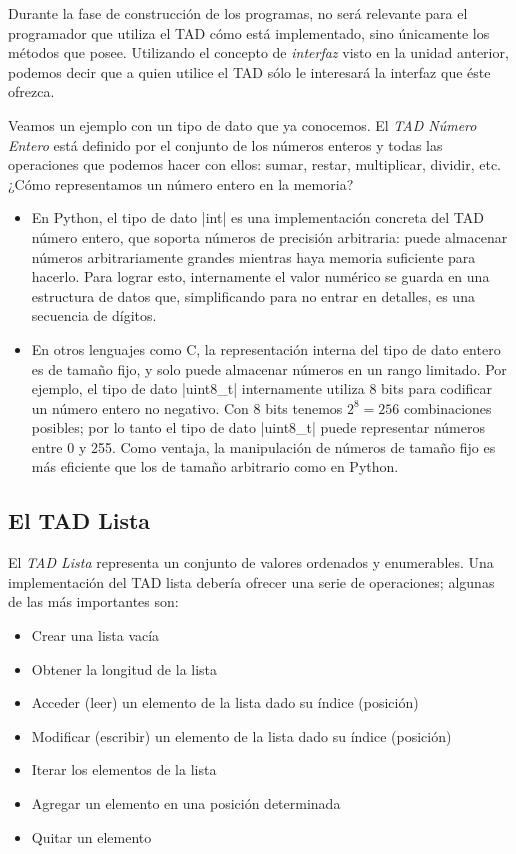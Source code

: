Durante la fase de construcción de los programas, no será relevante para el
programador que utiliza el TAD cómo está implementado, sino únicamente los
métodos que posee.
Utilizando el concepto de \emph{interfaz} visto en la unidad anterior, podemos
decir que a quien utilice el TAD sólo le interesará la interfaz que éste
ofrezca.

Veamos un ejemplo con un tipo de dato que ya conocemos. El \emph{TAD Número
Entero} está definido por el conjunto de los números enteros y todas las
operaciones que podemos hacer con ellos: sumar, restar, multiplicar, dividir,
etc. ¿Cómo representamos un número entero en la memoria?

\begin{itemize}
\item En Python, el tipo de dato |int| es una implementación concreta del TAD
número entero, que soporta números de precisión arbitraria: puede almacenar
números arbitrariamente grandes mientras haya memoria suficiente para hacerlo.
Para lograr esto, internamente el valor numérico se guarda en una estructura de
datos que, simplificando para no entrar en detalles, es una secuencia de dígitos.

\item En otros lenguajes como C, la representación interna del tipo de dato entero es
de tamaño fijo, y solo puede almacenar números en un rango limitado. Por
ejemplo, el tipo de dato |uint8_t| internamente utiliza 8 bits para codificar
un número entero no negativo. Con 8 bits tenemos $2^8=256$ combinaciones
posibles; por lo tanto el tipo de dato |uint8_t| puede representar números
entre 0 y 255. Como ventaja, la manipulación de números de tamaño fijo es más
eficiente que los de tamaño arbitrario como en Python.
\end{itemize}

\subsection{El TAD Lista}

El \emph{TAD Lista} representa un conjunto de valores ordenados y enumerables.
Una implementación del TAD lista debería ofrecer una serie de operaciones;
algunas de las más importantes son:

\begin{itemize}
    \item Crear una lista vacía
    \item Obtener la longitud de la lista
    \item Acceder (leer) un elemento de la lista dado su índice (posición)
    \item Modificar (escribir) un elemento de la lista dado su índice (posición)
    \item Iterar los elementos de la lista
    \item Agregar un elemento en una posición determinada
    \item Quitar un elemento
\end{itemize}

